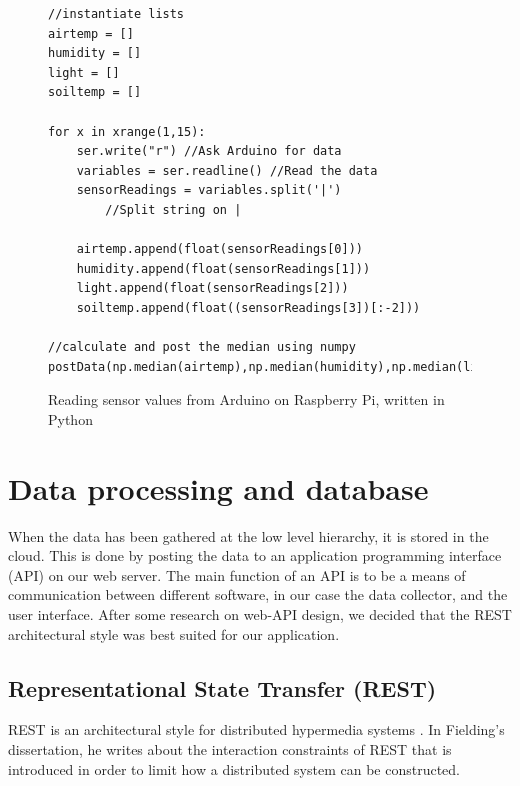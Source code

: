 \begin{figure}
	\begin{lstlisting}[style=htmlcssjs]
//instantiate lists
airtemp = []
humidity = []
light = []
soiltemp = [] 

for x in xrange(1,15): 
	ser.write("r") //Ask Arduino for data
	variables = ser.readline() //Read the data
	sensorReadings = variables.split('|') 
		//Split string on |

	airtemp.append(float(sensorReadings[0]))
	humidity.append(float(sensorReadings[1]))
	light.append(float(sensorReadings[2]))
	soiltemp.append(float((sensorReadings[3])[:-2])) 

//calculate and post the median using numpy
postData(np.median(airtemp),np.median(humidity),np.median(light),np.median(soiltemp)) 
	\end{lstlisting}
\caption{Reading sensor values from Arduino on Raspberry Pi, written in Python}
\label{fig:Raspberrycode}
\end{figure}

\section{Data processing and database}
When the data has been gathered at the low level hierarchy, it is stored in the cloud. This is done by posting the data to an application programming interface (API) on our web server. The main function of an API is to be a means of communication between different software, in our case the data collector, and the user interface. After some research on web-API design, we decided that the REST architectural style was best suited for our application. 

\subsection{Representational State Transfer (REST)}
REST is an architectural style for distributed hypermedia systems \citep{fielding2000architectural}. In Fielding's dissertation, he writes about the interaction constraints of REST that is introduced in order to limit how a distributed system can be constructed. 


